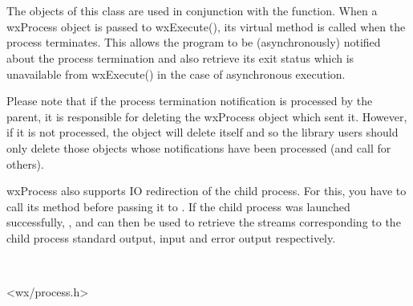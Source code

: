 \section{}\label{wxprocess}

The objects of this class are used in conjunction with the
 function. When a wxProcess object is passed to
wxExecute(), its  virtual method
is called when the process terminates. This allows the program to be
(asynchronously) notified about the process termination and also retrieve its
exit status which is unavailable from wxExecute() in the case of
asynchronous execution.

Please note that if the process termination notification is processed by the
parent, it is responsible for deleting the wxProcess object which sent it.
However, if it is not processed, the object will delete itself and so the
library users should only delete those objects whose notifications have been
processed (and call  for others).

wxProcess also supports IO redirection of the child process. For this, you have
to call its  method before passing it to
. If the child process was launched successfully,
,
 and
 can then be used to retrieve
the streams corresponding to the child process standard output, input and
error output respectively.



\\


<wx/process.h>




\\


